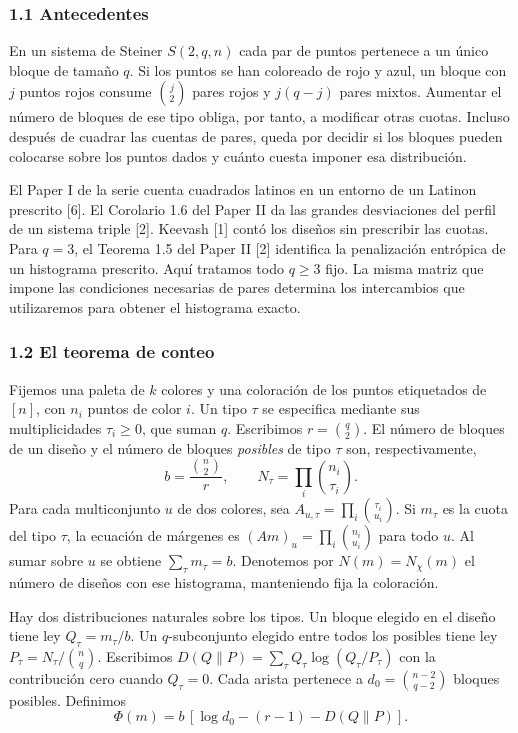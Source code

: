 \documentclass[spanish,11pt,a4paper]{article}
\begin{document}
\subsubsection{1.1 Antecedentes}\label{antecedentes}

En un sistema de Steiner \(S(2,q,n)\) cada par de puntos pertenece a un único bloque de tamaño \(q\). Si los puntos se han coloreado de rojo y azul, un bloque con \(j\) puntos rojos consume \(\binom j2\) pares rojos y \(j(q-j)\) pares mixtos. Aumentar el número de bloques de ese tipo obliga, por tanto, a modificar otras cuotas. Incluso después de cuadrar las cuentas de pares, queda por decidir si los bloques pueden colocarse sobre los puntos dados y cuánto cuesta imponer esa distribución.

El Paper I de la serie cuenta cuadrados latinos en un entorno de un Latinon prescrito {[}6{]}. El Corolario 1.6 del Paper II da las grandes desviaciones del perfil de un sistema triple {[}2{]}. Keevash {[}1{]} contó los diseños sin prescribir las cuotas. Para \(q=3\), el Teorema 1.5 del Paper II {[}2{]} identifica la penalización entrópica de un histograma prescrito. Aquí tratamos todo \(q\ge3\) fijo. La misma matriz que impone las condiciones necesarias de pares determina los intercambios que utilizaremos para obtener el histograma exacto.

\subsubsection{1.2 El teorema de conteo}\label{el-teorema-de-conteo}

Fijemos una paleta de \(k\) colores y una coloración de los puntos etiquetados de \([n]\), con \(n_i\) puntos de color \(i\). Un tipo \(\tau\) se especifica mediante sus multiplicidades \(\tau_i\ge0\), que suman \(q\). Escribimos \(r=\binom q2\). El número de bloques de un diseño y el número de bloques \emph{posibles} de tipo \(\tau\) son, respectivamente, \[b=\frac{\binom n2}{r},\qquad N_\tau=\prod_i\binom{n_i}{\tau_i}.\] Para cada multiconjunto \(u\) de dos colores, sea \(A_{u,\tau}=\prod_i\binom{\tau_i}{u_i}\). Si \(m_\tau\) es la cuota del tipo \(\tau\), la ecuación de márgenes es \((Am)_u=\prod_i\binom{n_i}{u_i}\) para todo \(u\). Al sumar sobre \(u\) se obtiene \(\sum_\tau m_\tau=b\). Denotemos por \(N(m)=N_\chi(m)\) el número de diseños con ese histograma, manteniendo fija la coloración.

Hay dos distribuciones naturales sobre los tipos. Un bloque elegido en el diseño tiene ley \(Q_\tau=m_\tau/b\). Un \(q\)-subconjunto elegido entre todos los posibles tiene ley \(P_\tau=N_\tau/\binom nq\). Escribimos \(D(Q\|P)=\sum_\tau Q_\tau\log(Q_\tau/P_\tau)\) con la contribución cero cuando \(Q_\tau=0\). Cada arista pertenece a \(d_0=\binom{n-2}{q-2}\) bloques posibles. Definimos \[\Phi(m)=b\,[\log d_0-(r-1)-D(Q\|P)]. \tag{1}\]
\end{document}
